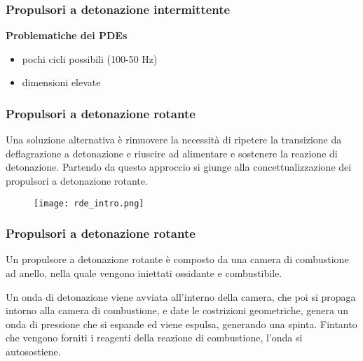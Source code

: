 \begin{frame}
  \frametitle{Propulsori a detonazione intermittente}
  \textbf{Problematiche dei PDEs}
  \begin{itemize}
    \item pochi cicli possibili (100-50 Hz)%
    \item dimensioni elevate%
  \end{itemize}
\end{frame}
\begin{frame}
  \frametitle{Propulsori a detonazione rotante}
  Una soluzione alternativa è rimuovere la necessità di ripetere la transizione da deflagrazione a detonazione e riuscire ad alimentare e sostenere la reazione di detonazione. Partendo da questo approccio si giunge alla concettualizzazione dei propulsori a detonazione rotante.
\begin{figure}[H]
\centering
\texttt{[image: rde\_intro.png]} %
\end{figure}
\end{frame}
\begin{frame}
  \frametitle{Propulsori a detonazione rotante}
  Un propulsore a detonazione rotante è composto da una camera di combustione ad anello, nella quale vengono iniettati ossidante e combustibile. 

 Un onda di detonazione viene avviata all'interno della camera, che poi si propaga intorno alla camera di combustione, e date le costrizioni geometriche, genera un onda di pressione che si espande ed viene espulsa, generando una spinta. Fintanto che vengono forniti i reagenti della reazione di combustione, l'onda si autosostiene. 
\end{frame}
